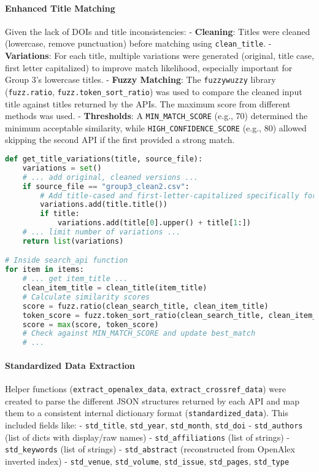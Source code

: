 \documentclass[12pt]{article}
\begin{document}
\paragraph{Enhanced Title
Matching}\label{enhanced-title-matching}

Given the lack of DOIs and title inconsistencies: - \textbf{Cleaning}:
Titles were cleaned (lowercase, remove punctuation) before matching
using \texttt{clean\_title}. - \textbf{Variations}: For each title,
multiple variations were generated (original, title case, first letter
capitalized) to improve match likelihood, especially important for Group
3's lowercase titles. - \textbf{Fuzzy Matching}: The \texttt{fuzzywuzzy}
library (\texttt{fuzz.ratio}, \texttt{fuzz.token\_sort\_ratio}) was used
to compare the cleaned input title against titles returned by the APIs.
The maximum score from different methods was used. -
\textbf{Thresholds}: A \texttt{MIN\_MATCH\_SCORE} (e.g., 70) determined
the minimum acceptable similarity, while
\texttt{HIGH\_CONFIDENCE\_SCORE} (e.g., 80) allowed skipping the second
API if the first provided a strong match.

\begin{lstlisting}[language=Python]
def get_title_variations(title, source_file):
    variations = set()
    # ... add original, cleaned versions ...
    if source_file == "group3_clean2.csv":
        # Add title-cased and first-letter-capitalized specifically for group 3
        variations.add(title.title())
        if title:
            variations.add(title[0].upper() + title[1:])
    # ... limit number of variations ...
    return list(variations)

# Inside search_api function
for item in items:
    # ... get item_title ...
    clean_item_title = clean_title(item_title)
    # Calculate similarity scores
    score = fuzz.ratio(clean_search_title, clean_item_title)
    token_score = fuzz.token_sort_ratio(clean_search_title, clean_item_title)
    score = max(score, token_score)
    # Check against MIN_MATCH_SCORE and update best_match
    # ...
\end{lstlisting}

\paragraph{Standardized Data
Extraction}\label{standardized-data-extraction}

Helper functions (\texttt{extract\_openalex\_data},
\texttt{extract\_crossref\_data}) were created to parse the different
JSON structures returned by each API and map them to a consistent
internal dictionary format (\texttt{standardized\_data}). This included
fields like: - \texttt{std\_title}, \texttt{std\_year},
\texttt{std\_month}, \texttt{std\_doi} - \texttt{std\_authors} (list of
dicts with display/raw names) - \texttt{std\_affiliations} (list of
strings) - \texttt{std\_keywords} (list of strings) -
\texttt{std\_abstract} (reconstructed from OpenAlex inverted index) -
\texttt{std\_venue}, \texttt{std\_volume}, \texttt{std\_issue},
\texttt{std\_pages}, \texttt{std\_type}
\end{document}

